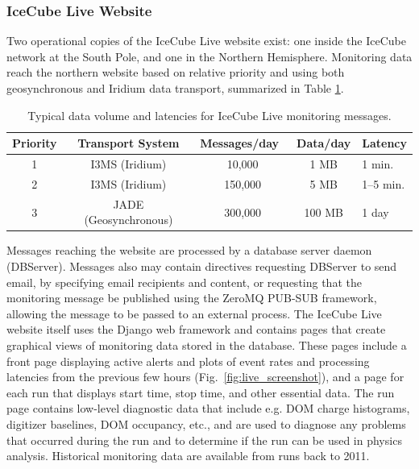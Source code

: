 \subsubsection{IceCube Live Website}

Two operational copies of the IceCube Live website exist: one inside the
IceCube network at the South Pole, and one in the Northern Hemisphere.
Monitoring data reach the northern website based on relative priority and using
both geosynchronous and Iridium data transport, summarized in Table
\ref{i3messages}.

\begin{table}[!ht]
  \centering
  \caption{Typical data volume and latencies for IceCube Live monitoring
    messages.} 
  \label{i3messages}  
  \begin{tabularx}{0.85\textwidth}{|c|c|c|c|X|}
    \hline Priority & Transport System & Messages/day~ & Data/day & Latency\\
    \hline 1 & I3MS (Iridium) & 10,000 & 1 MB & 1 min. \\
    \hline 2 & I3MS (Iridium) & 150,000 & 5 MB & 1--5 min. \\
    \hline 3 & JADE (Geosynchronous) & 300,000 & 100 MB & 1 day \\
    \hline
  \end{tabularx}
\end{table}

Messages reaching the website are processed by a database server daemon
(DBServer).  Messages also may contain directives requesting DBServer to send email, by
specifying email recipients and content, or requesting that the monitoring
message be published using the ZeroMQ PUB-SUB framework, allowing the message to be
passed to an external process.  The IceCube Live website itself uses the
Django web framework and contains pages that create graphical views of
monitoring data stored in the database.  These pages include a front page
displaying active alerts and plots of event rates and processing latencies
from the previous few hours (Fig.~\ref{fig:live_screenshot}), and a page
for each run that displays start  
time, stop time, and other essential data.  The run page contains low-level
diagnostic data that include e.g. DOM charge histograms, digitizer baselines,
DOM occupancy, etc., and are used to diagnose any problems that occurred
during the run and to determine if the run can be used in physics
analysis.  Historical monitoring data are available from runs back to
2011.  

